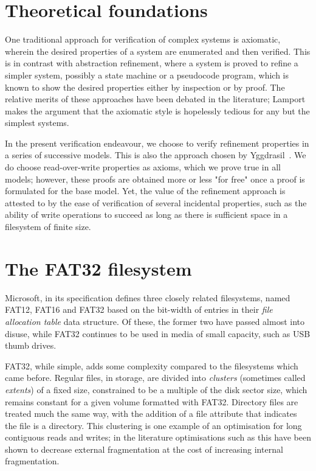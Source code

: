 \documentclass[runningheads,a4paper]{llncs}
\begin{document}
\section{Theoretical foundations}

One traditional approach for verification of complex systems is
axiomatic, wherein the desired properties of a system are enumerated
and then verified. This is in contrast with abstraction refinement,
where a system is proved to refine a simpler system, possibly a state
machine or a pseudocode program, which is known to show the desired
properties either by inspection or by proof. The relative merits of
these approaches have been debated in the literature;
Lamport~\cite{lamport1993verification} makes the argument that the
axiomatic style is hopelessly tedious for any but the simplest
systems.

In the present verification endeavour, we choose to verify
refinement properties in a series of successive models. This is also
the approach chosen by Yggdrasil~\cite{sigurbjarnarson2016push}. We do
choose read-over-write properties as axioms, which we prove true in all
models; however, these proofs are obtained more or less "for free"
once a proof is formulated for the base model. Yet, the value of the
refinement approach is attested to by the ease of verification of
several incidental properties, such as the ability of write operations
to succeed as long as there is sufficient space in a filesystem of
finite size.

\section{The FAT32 filesystem}

Microsoft, in its specification \cite{microsoft_2000} defines three
closely related filesystems, named FAT12, FAT16 and FAT32 based on the
bit-width of entries in their \textit{file allocation table} data
structure. Of these, the former two have passed almost into disuse,
while FAT32 continues to be used in media of small capacity, such as
USB thumb drives.

FAT32, while simple, adds some complexity compared to the filesystems
which came before. Regular files, in storage, are divided into
\textit{clusters} (sometimes called \textit{extents}) of a fixed size,
constrained to be a multiple of the disk sector size, which remains
constant for a given volume formatted
with FAT32. Directory files are treated much the same way, with the
addition of a file attribute that indicates the file is a
directory. This clustering is one example of an optimisation for long
contiguous reads and writes; in the literature optimisations such as
this have been shown to decrease external fragmentation at the cost of
increasing internal fragmentation.
\end{document}
